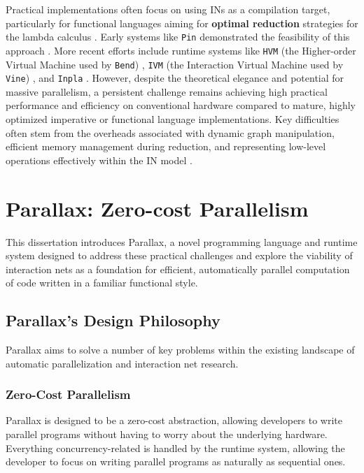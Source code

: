 Practical implementations often focus on using INs as a compilation target, particularly for functional languages aiming for \textbf{optimal reduction} strategies for the lambda calculus \cite{Asperti1999OptimalReduction}. Early systems like \texttt{Pin} demonstrated the feasibility of this approach \cite{Asperti2002Pin}. More recent efforts include runtime systems like \texttt{HVM} (the Higher-order Virtual Machine used by \texttt{Bend}) \cite{HVMGithub}, \texttt{IVM} (the Interaction Virtual Machine used by \texttt{Vine}) \cite{VineGithub}, and \texttt{Inpla} \cite{inpla}. However, despite the theoretical elegance and potential for massive parallelism, a persistent challenge remains achieving high practical performance and efficiency on conventional hardware compared to mature, highly optimized imperative or functional language implementations. Key difficulties often stem from the overheads associated with dynamic graph manipulation, efficient memory management during reduction, and representing low-level operations effectively within the IN model \cite{Pinto2014InteractionNetsReview}.

\section{Parallax: Zero-cost Parallelism}

This dissertation introduces Parallax, a novel programming language and runtime system designed to address these practical challenges and explore the viability of interaction nets as a foundation for efficient, automatically parallel computation of code written in a familiar functional style.

\subsection{Parallax's Design Philosophy}

Parallax aims to solve a number of key problems within the existing landscape of automatic parallelization and interaction net research.

\subsubsection{Zero-Cost Parallelism}

Parallax is designed to be a zero-cost abstraction, allowing developers to write parallel programs without having to worry about the underlying hardware. Everything concurrency-related is handled by the runtime system, allowing the developer to focus on writing parallel programs as naturally as sequential ones.

